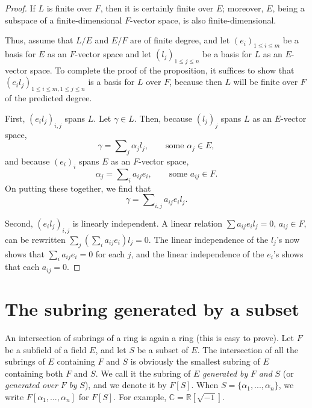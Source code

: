 \documentclass[a4paper,11pt,final,openany]{memoir}
\theoremstyle{nonumberplain}
\newtheorem{proof}{Proof.}
\begin{document}
\begin{proof}
If $L$ is finite over $F$, then it is certainly finite over $E$; moreover,
$E$, being a subspace of a finite-dimensional $F$-vector space, is also finite-dimensional.

Thus, assume that $L/E$ and $E/F$ are of finite degree, and let $(e_{i}%
)_{1\leq i\leq m}$ be a basis for $E$ as an $F$-vector space and let
$(l_{j})_{1\leq j\leq n}$ be a basis for $L$ as an $E$-vector space. To
complete the proof of the proposition, it suffices to show that $(e_{i}%
l_{j})_{1\leq i\leq m,1\leq j\leq n}$ is a basis for $L$ over $F$, because
then $L$ will be finite over $F$ of the predicted degree.

First, $(e_{i}l_{j})_{i,j}$ spans $L$. Let $\gamma\in L$. Then, because
$(l_{j})_{j}$ spans $L$ as an $E$-vector space,
\[
\gamma=%
{\textstyle\sum\nolimits_{j}}
\alpha_{j}l_{j},\qquad\text{some }\alpha_{j}\in E,
\]
and because $(e_{i})_{i}$ spans $E$ as an $F$-vector space,
\[
\alpha_{j}=%
{\textstyle\sum\nolimits_{i}}
a_{ij}e_{i},\qquad\text{some $a_{ij}\in F$}.
\]
On putting these together, we find that
\[
\gamma=%
{\textstyle\sum\nolimits_{i,j}}
a_{ij}e_{i}l_{j}.
\]


Second, $(e_{i}l_{j})_{i,j}$ is linearly independent. A linear relation $\sum
a_{ij}e_{i}l_{j}=0$, $a_{ij}\in F$, can be rewritten $\sum_{j}(\sum_{i}%
a_{ij}e_{i})l_{j}=0$. The linear independence of the $l_{j}$'s now shows that
$\sum_{i}a_{ij}e_{i}=0$ for each $j$, and the linear independence of the
$e_{i}$'s shows that each $a_{ij}=0$.
\end{proof}

\section{The subring generated by a subset}%

%


An intersection of subrings of a ring is again a ring (this is easy to prove).
Let $F$ be a subfield of a field $E$, and let $S$ be a subset of $E$. The
intersection of all the subrings of $E$ containing $F$ and $S$ is obviously
the smallest subring of $E$ containing both $F$ and $S$. We call it the
subring of $E$ \emph{generated by} $F$ \emph{and} $S$ (or \emph{generated
over} $F$ \emph{by} $S$), and we denote it by $F[S]$. When $S=\{\alpha
_{1},...,\alpha_{n}\}$, we write $F[\alpha_{1},...,\alpha_{n}]$ for $F[S]$.
For example, $\mathbb{C}{}=\mathbb{R}{}[\sqrt{-1}]$.
\end{document}

